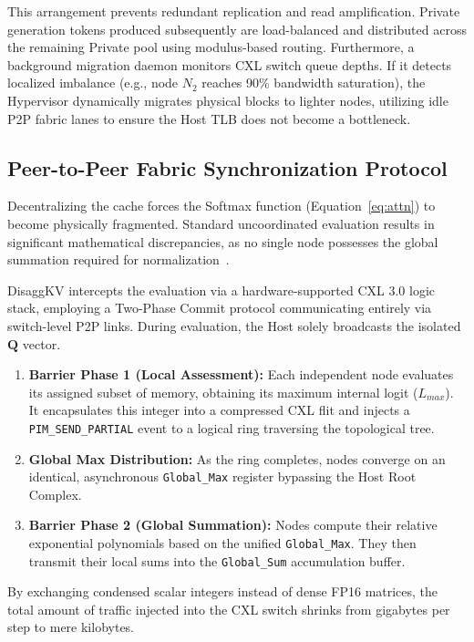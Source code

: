 \documentclass[10pt,conference]{IEEEtran}
\begin{document}
This arrangement prevents redundant replication and read amplification. Private generation tokens produced subsequently are load-balanced and distributed across the remaining Private pool using modulus-based routing. Furthermore, a background migration daemon monitors CXL switch queue depths. If it detects localized imbalance (e.g., node $N_2$ reaches 90\% bandwidth saturation), the Hypervisor dynamically migrates physical blocks to lighter nodes, utilizing idle P2P fabric lanes to ensure the Host TLB does not become a bottleneck.

\subsection{Peer-to-Peer Fabric Synchronization Protocol}

Decentralizing the cache forces the Softmax function (Equation~\ref{eq:attn}) to become physically fragmented. Standard uncoordinated evaluation results in significant mathematical discrepancies, as no single node possesses the global summation required for normalization~\cite{ring_attention, seq_parallel}.

DisaggKV intercepts the evaluation via a hardware-supported CXL 3.0 logic stack, employing a Two-Phase Commit protocol communicating entirely via switch-level P2P links. During evaluation, the Host solely broadcasts the isolated $\mathbf{Q}$ vector.
\begin{enumerate}
    \item \textbf{Barrier Phase 1 (Local Assessment):} Each independent node evaluates its assigned subset of memory, obtaining its maximum internal logit ($L_{max}$). It encapsulates this integer into a compressed CXL flit and injects a \texttt{PIM\_SEND\_PARTIAL} event to a logical ring traversing the topological tree. 
    \item \textbf{Global Max Distribution:} As the ring completes, nodes converge on an identical, asynchronous \texttt{Global\_Max} register bypassing the Host Root Complex.
    \item \textbf{Barrier Phase 2 (Global Summation):} Nodes compute their relative exponential polynomials based on the unified \texttt{Global\_Max}. They then transmit their local sums into the \texttt{Global\_Sum} accumulation buffer. 
\end{enumerate}
By exchanging condensed scalar integers instead of dense FP16 matrices, the total amount of traffic injected into the CXL switch shrinks from gigabytes per step to mere kilobytes.
\end{document}
